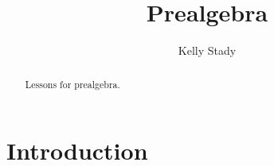 \documentclass[handout]{xourse}
\title{Prealgebra}
\author{Kelly Stady}
\begin{document}
\begin{abstract}
    Lessons for prealgebra.
\end{abstract}
\maketitle

\part{Introduction}  %

\end{document}
